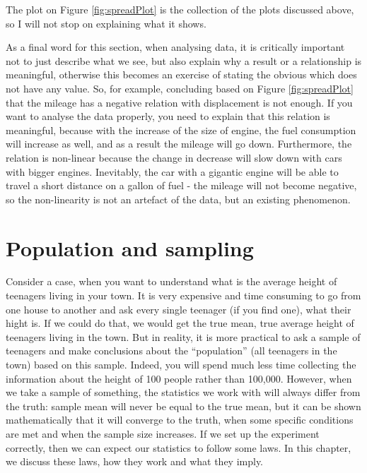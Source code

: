 \documentclass[
]{book}
\theoremstyle{definition}
\theoremstyle{definition}
\theoremstyle{definition}
\theoremstyle{definition}
\theoremstyle{remark}
\begin{document}
The plot on Figure \ref{fig:spreadPlot} is the collection of the plots discussed above, so I will not stop on explaining what it shows.

As a final word for this section, when analysing data, it is critically important not to just describe what we see, but also explain why a result or a relationship is meaningful, otherwise this becomes an exercise of stating the obvious which does not have any value. So, for example, concluding based on Figure \ref{fig:spreadPlot} that the mileage has a negative relation with displacement is not enough. If you want to analyse the data properly, you need to explain that this relation is meaningful, because with the increase of the size of engine, the fuel consumption will increase as well, and as a result the mileage will go down. Furthermore, the relation is non-linear because the change in decrease will slow down with cars with bigger engines. Inevitably, the car with a gigantic engine will be able to travel a short distance on a gallon of fuel - the mileage will not become negative, so the non-linearity is not an artefact of the data, but an existing phenomenon.

\chapter{Population and sampling}\label{PopulationSampling}

Consider a case, when you want to understand what is the average height of teenagers living in your town. It is very expensive and time consuming to go from one house to another and ask every single teenager (if you find one), what their hight is. If we could do that, we would get the true mean, true average height of teenagers living in the town. But in reality, it is more practical to ask a sample of teenagers and make conclusions about the ``population'' (all teenagers in the town) based on this sample. Indeed, you will spend much less time collecting the information about the height of 100 people rather than 100,000. However, when we take a sample of something, the statistics we work with will always differ from the truth: sample mean will never be equal to the true mean, but it can be shown mathematically that it will converge to the truth, when some specific conditions are met and when the sample size increases. If we set up the experiment correctly, then we can expect our statistics to follow some laws. In this chapter, we discuss these laws, how they work and what they imply.
\end{document}
